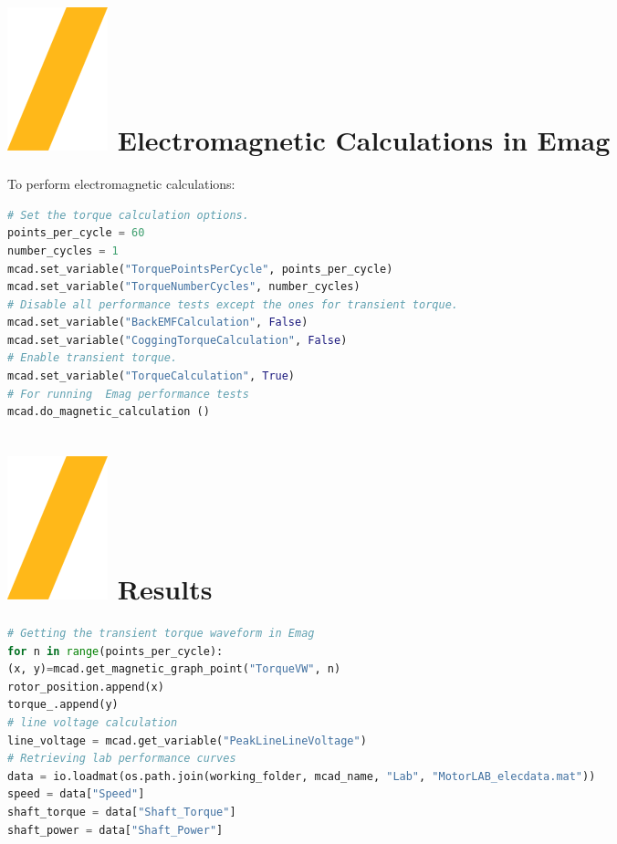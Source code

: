 \documentclass[landscape]{article}
\begin{document}
\begin{multicols}{3}
\section{\includegraphics[height=\fontcharht\font`\S]{slash.png} Electromagnetic Calculations in Emag}
To perform electromagnetic calculations:
\begin{lstlisting}[language=Python]
# Set the torque calculation options.
points_per_cycle = 60 
number_cycles = 1
mcad.set_variable("TorquePointsPerCycle", points_per_cycle)
mcad.set_variable("TorqueNumberCycles", number_cycles)
# Disable all performance tests except the ones for transient torque.
mcad.set_variable("BackEMFCalculation", False)
mcad.set_variable("CoggingTorqueCalculation", False)
# Enable transient torque.
mcad.set_variable("TorqueCalculation", True)
# For running  Emag performance tests
mcad.do_magnetic_calculation ()
\end{lstlisting}


\section{\includegraphics[height=\fontcharht\font`\S]{slash.png} Results}
\begin{lstlisting}[language=Python]
# Getting the transient torque waveform in Emag 
for n in range(points_per_cycle):
(x, y)=mcad.get_magnetic_graph_point("TorqueVW", n)
rotor_position.append(x)
torque_.append(y)
# line voltage calculation
line_voltage = mcad.get_variable("PeakLineLineVoltage")
# Retrieving lab performance curves 
data = io.loadmat(os.path.join(working_folder, mcad_name, "Lab", "MotorLAB_elecdata.mat"))
speed = data["Speed"]
shaft_torque = data["Shaft_Torque"]
shaft_power = data["Shaft_Power"]
\end{lstlisting}


\end{multicols}
\end{document}
